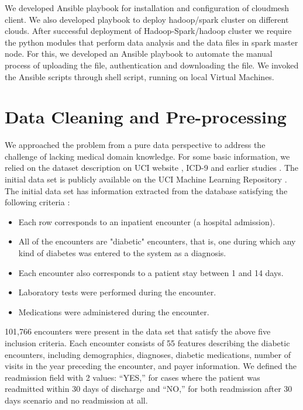 \documentclass[9pt,twocolumn,twoside]{../../styles/osajnl}
\begin{document}
 We developed Ansible playbook for installation and configuration of cloudmesh client. We also developed playbook to deploy hadoop/spark cluster on different clouds. After successful deployment of Hadoop-Spark/hadoop cluster we require the python modules that perform data analysis and the data files in spark master node. For this, we developed an Ansible playbook to automate the manual process of uploading the file, authentication and downloading the file. We invoked the Ansible scripts through shell script, running on local Virtual Machines.


\section{Data Cleaning and Pre-processing}
We approached the problem from a pure data perspective to address the challenge of lacking medical domain knowledge. For some basic information, we relied on the dataset description on UCI website \cite{www-dataset}, ICD-9 \cite{www-icd9} and earlier studies \cite{article-hindawi}.
The initial data set is publicly available on the UCI Machine Learning Repository \cite{www-dataset}.
The initial data set has information extracted from the database satisfying the following criteria \cite{article-hindawi}:
\begin{itemize}
    \item Each row corresponds to an inpatient encounter (a hospital admission).
    \item All of the encounters are "diabetic" encounters, that is, one during which any kind of diabetes was entered to the system as a diagnosis.
    \item Each encounter also corresponds to a patient stay between 1 and 14 days.
    \item Laboratory tests were performed during the encounter.
    \item Medications were administered during the encounter.
\end{itemize}

101,766 encounters were present in  the data set that satisfy the above five inclusion criteria. Each encounter consists of 55 features describing the diabetic encounters, including demographics, diagnoses, diabetic medications, number of visits in the year preceding the encounter, and payer information. We defined the readmission  field with 2 values: “YES,” for cases where the patient was readmitted within 30 days of discharge and “NO,” for both readmission after 30 days scenario and no readmission at all.
\end{document}
